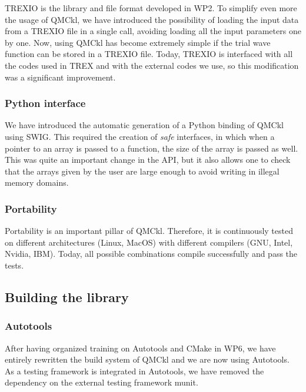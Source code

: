 TREXIO\cite{trexio} is the library and file format developed in \ac{WP}2.
To simplify even more the usage of QMCkl, we have introduced the
possibility of loading the input data from a TREXIO file in a single
call, avoiding loading all the input parameters one by one. Now, using
QMCkl has become extremely simple if the trial wave function can be
stored in a TREXIO file. Today, TREXIO is interfaced with all the
codes used in TREX and with the external codes we use, so this
modification was a significant improvement.

\subsubsection{Python interface}

We have introduced the automatic generation of a Python binding of
QMCkl using SWIG. This required the creation of \emph{safe} interfaces,
in which when a pointer to an array is passed to a function, the size
of the array is passed as well. This was quite an important change in
the API, but it also allows one to check that the arrays given by the user
are large enough to avoid writing in illegal memory domains.

\subsubsection{Portability}

Portability is an important pillar of QMCkl. Therefore, it is
continuously tested on different architectures (Linux, MacOS) with
different compilers (GNU, Intel, Nvidia, IBM). Today, all possible
combinations compile successfully and pass the tests.



\subsection{Building the library}

\subsubsection{Autotools}

After having organized training on Autotools\cite{Autotools} and CMake\cite{cmake} in WP6,
we have entirely rewritten the build system of QMCkl and we are now using
Autotools. As a testing framework is integrated in Autotools, we have
removed the dependency on the external testing framework munit.\cite{munit}

